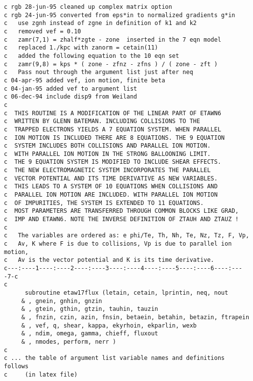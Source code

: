 \begin{verbatim}
c rgb 28-jun-95 cleaned up complex matrix option
c rgb 24-jun-95 converted from eps*in to normalized gradients g*in
c   use zgnh instead of zgne in definition of k1 and k2
c   removed vef = 0.10
c   zamr(7,1) = zhalf*zgte - zone  inserted in the 7 eqn model
c   replaced 1./kpc with zanorm = cetain(11)
c   added the following equation to the 10 eqn set
c   zamr(9,8) = kps * ( zone - zfnz - zfns ) / ( zone - zft )
c   Pass nout through the argument list just after neq
c 04-apr-95 added vef, ion motion, finite beta
c 04-jan-95 added vef to argument list
c 06-dec-94 include disp9 from Weiland
c
c  THIS ROUTINE IS A MODIFICATION OF THE LINEAR PART OF ETAWN6
c  WRITTEN BY GLENN BATEMAN. INCLUDING COLLISIONS TO THE
c  TRAPPED ELECTRONS YIELDS A 7 EQUATION SYSTEM. WHEN PARALLEL
c  ION MOTION IS INCLUDED THERE ARE 8 EQUATIONS. THE 9 EQUATION
c  SYSTEM INCLUDES BOTH COLLISIONS AND PARALLEL ION MOTION.
c  WITH PARALLEL ION MOTION IN THE STRONG BALLOONING LIMIT.
c  THE 9 EQUATION SYSTEM IS MODIFIED TO INCLUDE SHEAR EFFECTS.
c  THE NEW ELECTROMAGNETIC SYSTEM INCORPORATES THE PARALLEL
c  VECTOR POTENTIAL AND ITS TIME DERIVATIVE AS NEW VARIABLES.
c  THIS LEADS TO A SYSTEM OF 10 EQUATIONS WHEN COLLISIONS AND
c  PARALLEL ION MOTION ARE INCLUDED. WITH PARALLEL ION MOTION
c  OF IMPURITIES, THE SYSTEM IS EXTENDED TO 11 EQUATIONS.
c  MOST PARAMETERS ARE TRANSFERRED THROUGH COMMON BLOCKS LIKE GRAD,
c  IMP AND ETAWN6. NOTE THE INVERSE DEFINITION OF ZTAUH AND ZTAUZ !
c
c   The variables are ordered as: e phi/Te, Th, Nh, Te, Nz, Tz, F, Vp, 
c   Av, K where F is due to collisions, Vp is due to parallel ion motion,
c   Av is the vector potential and K is its time derivative.
c---:----1----:----2----:----3----:----4----:----5----:----6----:----7-c
c
      subroutine etaw17flux (letain, cetain, lprintin, neq, nout
     & , gnein, gnhin, gnzin
     & , gtein, gthin, gtzin, tauhin, tauzin
     & , fnzin, czin, azin, fnsin, betaein, betahin, betazin, ftrapein
     & , vef, q, shear, kappa, ekyrhoin, ekparlin, wexb
     & , ndim, omega, gamma, chieff, fluxout
     & , nmodes, perform, nerr )
c
c ... the table of argument list variable names and definitions follows
c     (in latex file)
\end{verbatim}
\newpage
\renewcommand{\arraystretch}{1.0}
